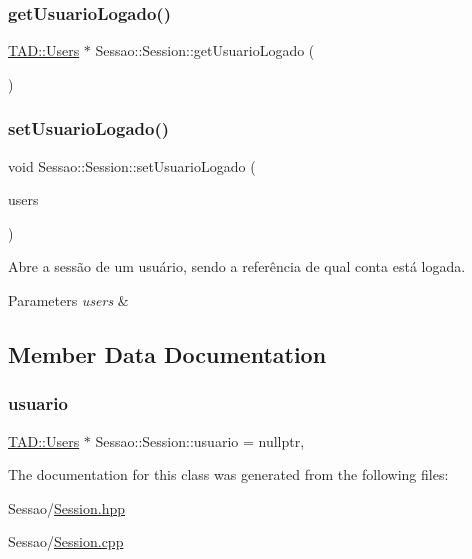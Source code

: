 \subsubsection{\texorpdfstring{get\+Usuario\+Logado()}{getUsuarioLogado()}}
{\footnotesize\ttfamily \hyperlink{class_t_a_d_1_1_users}{T\+A\+D\+::\+Users} $\ast$ Sessao\+::\+Session\+::get\+Usuario\+Logado (\begin{DoxyParamCaption}{ }\end{DoxyParamCaption})\hspace{0.3cm}{\ttfamily [static]}}

\mbox{\label{class_sessao_1_1_session_a30fdda279777bd63c60c5e2b8a32d6d9}} 
\subsubsection{\texorpdfstring{set\+Usuario\+Logado()}{setUsuarioLogado()}}
{\footnotesize\ttfamily void Sessao\+::\+Session\+::set\+Usuario\+Logado (\begin{DoxyParamCaption}\item[{\hyperlink{class_t_a_d_1_1_users}{T\+A\+D\+::\+Users} $\ast$}]{users }\end{DoxyParamCaption})\hspace{0.3cm}{\ttfamily [static]}}



Abre a sessão de um usuário, sendo a referência de qual conta está logada. 


\begin{DoxyParams}{Parameters}
{\em users} & \\
\hline
\end{DoxyParams}


\subsection{Member Data Documentation}
\mbox{\label{class_sessao_1_1_session_a195b8a1008c331628c9dc566e7c41b2d}} 
\subsubsection{\texorpdfstring{usuario}{usuario}}
{\footnotesize\ttfamily \hyperlink{class_t_a_d_1_1_users}{T\+A\+D\+::\+Users} $\ast$ Sessao\+::\+Session\+::usuario = nullptr\hspace{0.3cm}{\ttfamily [static]}, {\ttfamily [private]}}



The documentation for this class was generated from the following files\+:\begin{DoxyCompactItemize}
\item 
Sessao/\hyperlink{_session_8hpp}{Session.\+hpp}\item 
Sessao/\hyperlink{_session_8cpp}{Session.\+cpp}\end{DoxyCompactItemize}
